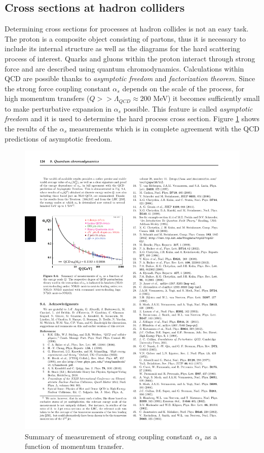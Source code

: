 
\subsection{Cross sections at hadron colliders}
\label{subsec:2.1}

	Determining cross sections for processes at hadron collides is not an easy task. The proton is a composite object consisting of partons, thus it is necessary to include its internal structure as well as the diagrams for the hard scattering process of interest. Quarks and gluons within the proton interact through strong force and are described using quantum chromodynamics. Calculations within QCD are possible thanks to \textit{asymptotic freedom} and \textit{factorization theorem}. Since the strong force coupling constant $\alpha_s$ depends on the scale of the process, for high momentum transfers ($Q >> \Lambda_{QCD}\approx 200$ MeV) it becomes sufficiently small to make perturbative expansion in $\alpha_s$ possible. This feature is called \textit{asymptotic freedom} and it is used to determine the hard process cross section. Figure \ref{fig:alpha_s} shows the results of the $\alpha_s$ measurements which is in complete agreement with the QCD predictions of asymptotic freedom. \\
\begin{figure}[htbp]
	\centering
		\includegraphics{Figures/alpha_s.pdf}
	\caption[Strong force coupling constant]{Summary of measurement of strong coupling constant $\alpha_s$ as a function of momentum transfer\cite{Agashe:2014kda}. }
	\label{fig:alpha_s}
\end{figure}

